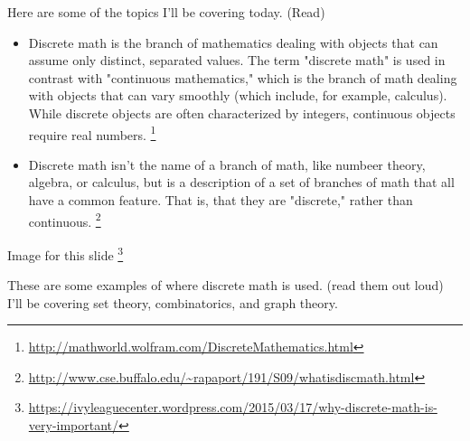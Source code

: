 \documentclass{amsart}
\theoremstyle{definition}
\theoremstyle{remark}
\numberwithin{equation}{section}
\begin{document}
Here are some of the topics I'll be covering today. (Read)
\begin{itemize}
    \item Discrete math is the branch of mathematics dealing with objects that can assume only distinct, separated values. The term "discrete math" is used in contrast with "continuous mathematics," which is the branch of math dealing with objects that can vary smoothly (which include, for example, calculus). While discrete objects are often characterized by integers, continuous objects require real numbers.%
\footnote{\url{http://mathworld.wolfram.com/DiscreteMathematics.html}}%

    \item Discrete math isn't the name of a branch of math, like numbeer theory, algebra, or calculus, but is a description of a set of branches of math that all have a common feature. That is, that they are "discrete," rather than continuous.%
\footnote{\url{http://www.cse.buffalo.edu/~rapaport/191/S09/whatisdiscmath.html}}%
\end{itemize}

Image for this slide%
\footnote{\url{https://ivyleaguecenter.wordpress.com/2015/03/17/why-discrete-math-is-very-important/}}%

These are some examples of where discrete math is used. (read them out loud) I'll be covering set theory, combinatorics, and graph theory.
\end{document}
